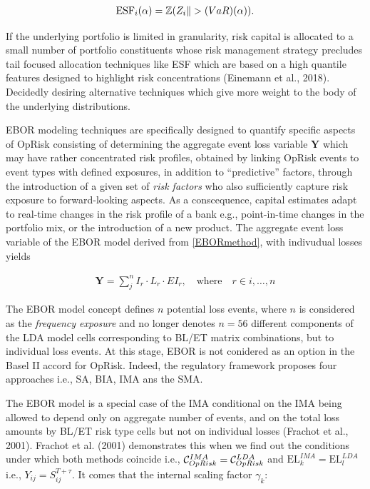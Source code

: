 \documentclass{DissertateUSU}
\begin{document}
\singlespacing

\begin{eqnarray}
\mbox{ESF}_i(\alpha) = \mathbb{Z}(Z_i\| > \mbox(VaR)(\alpha)).
\end{eqnarray} \doublespacing

If the underlying portfolio is limited in granularity, risk capital is
allocated to a small number of portfolio constituents whose risk
management strategy precludes tail focused allocation techniques like
ESF which are based on a high quantile features designed to highlight
risk concentrations (Einemann et al., 2018). Decidedly desiring
alternative techniques which give more weight to the body of the
underlying distributions.\medskip

EBOR modeling techniques are specifically designed to quantify specific
aspects of OpRisk consisting of determining the aggregate event loss
variable \(\mathbf{Y}\) which may have rather concentrated risk
profiles, obtained by linking OpRisk events to event types with defined
exposures, in addition to ``predictive'' factors, through the
introduction of a given set of \emph{risk factors} who also sufficiently
capture risk exposure to forward-looking aspects. As a conscequence,
capital estimates adapt to real-time changes in the risk profile of a
bank e.g., point-in-time changes in the portfolio mix, or the
introduction of a new product. The aggregate event loss variable of the
EBOR model derived from \ref{EBORmethod}, with indivudual losses yields

\singlespacing

\begin{eqnarray}\label{EBORmodel}
\mathbf{Y} =\sum_j^n I_r\cdot L_r\cdot EI_r, \quad \mbox{where}\quad r \in {i,\ldots,n}
\end{eqnarray} \doublespacing

The EBOR model concept defines \(n\) potential loss events, where \(n\)
is considered as the \emph{frequency exposure} and no longer denotes
\(n=56\) different components of the LDA model cells corresponding to
BL/ET matrix combinations, but to individual loss events. At this stage,
EBOR is not conidered as an option in the Basel II accord for OpRisk.
Indeed, the regulatory framework proposes four approaches i.e., SA, BIA,
IMA ans the SMA.\medskip

The EBOR model is a special case of the IMA conditional on the IMA being
allowed to depend only on aggregate number of events, and on the total
loss amounts by BL/ET risk type cells but not on individual losses
(Frachot et al., 2001). Frachot et al. (2001) demonstrates this when we
find out the conditions under which both methods coincide i.e.,
\(\mathcal{\Large{C}}_{OpRisk}^{IMA} = \mathcal{\Large{C}}_{OpRisk}^{LDA}\)
and \(\mbox{EL}_{k}^{IMA}=\mbox{EL}_l^{LDA}\) i.e.,
\(Y_{ij} = S_{ij}^{T+\tau}\). It comes that the internal scaling factor
\(\gamma_k\):\medskip
\end{document}
